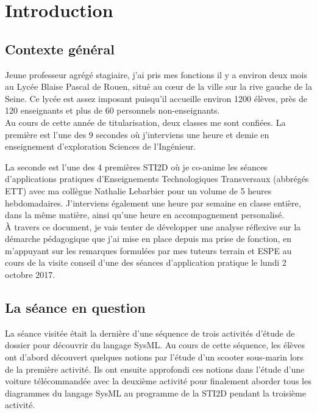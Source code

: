 \documentclass[pdftex,a4paper,12pt]{article}
\begin{document}
	
	\section{Introduction}
	\subsection{Contexte général}
	Jeune professeur agrégé stagiaire, j'ai pris mes fonctions il y a environ deux mois au Lycée Blaise Pascal de Rouen, 
	situé au c\oe{}ur de la ville sur la rive gauche de la Seine.
	Ce lycée est assez imposant puisqu'il accueille environ 1200 élèves, près de 120 enseignants et plus de 60 personnels non-enseignants.\\
	
	Au cours de cette année de titularisation, deux classes me sont confiées.
	La première est l'une des 9 secondes où j'interviens une heure et demie en enseignement d'exploration \og{}Sciences de l'Ingénieur\fg{}.

	La seconde est l'une des 4 premières STI2D où je co-anime les séances d'applications pratiques d'Enseignements Technologiques Transversaux (abbrégés ETT) 
	avec ma collègue Nathalie Lebarbier pour un volume de 5 heures hebdomadaires.
	J'interviens également une heure par semaine en classe entière, dans la même matière, ainsi qu'une heure en accompagnement personalisé.\\

	À travers ce document, je vais tenter de développer une analyse réflexive sur la démarche pédagogique que j'ai mise en place depuis ma prise de fonction,
	en m'appuyant sur les remarques formulées par mes tuteurs terrain et ESPE au cours de la visite conseil 
	d'une des séances d'application pratique le lundi 2 octobre 2017.

	\subsection{La séance en question}
	La séance visitée était la dernière d'une séquence de trois activités d'étude de dossier pour découvrir du langage SysML.
	Au cours de cette séquence, les élèves ont d'abord découvert quelques notions par l'étude d'un scooter sous-marin lors de la première activité. 
	Ils ont ensuite approfondi ces notions dans l'étude d'une voiture télécommandée avec la deuxième activité
	pour finalement aborder tous les diagrammes du langage SysML au programme de la STI2D pendant la troisième activité.
\end{document}
